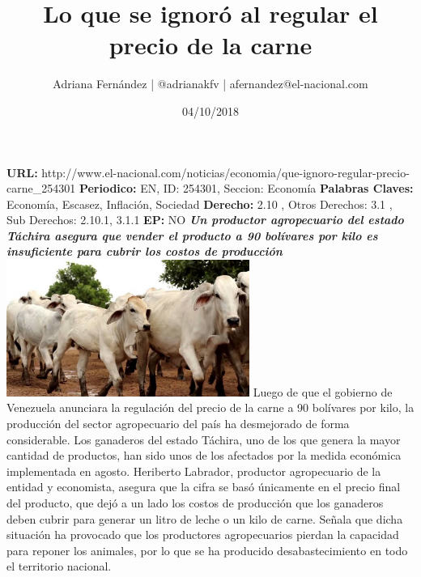 \documentclass{article}%
\title{\textbf{Lo que se ignoró al regular el precio de la carne}}%
\author{Adriana Fernández | @adrianakfv | afernandez@el{-}nacional.com}%
\date{04/10/2018}%
\begin{document}
%
\normalsize%
\maketitle%
\textbf{URL: }%
http://www.el{-}nacional.com/noticias/economia/que{-}ignoro{-}regular{-}precio{-}carne\_254301\newline%
%
\textbf{Periodico: }%
EN, %
ID: %
254301, %
Seccion: %
Economía\newline%
%
\textbf{Palabras Claves: }%
Economía, Escasez, Inflación, Sociedad\newline%
%
\textbf{Derecho: }%
2.10%
, Otros Derechos: %
3.1%
, Sub Derechos: %
2.10.1, 3.1.1%
\newline%
%
\textbf{EP: }%
NO\newline%
\newline%
%
\textbf{\textit{Un productor agropecuario del estado Táchira asegura que vender el producto a 90 bolívares por kilo es insuficiente para cubrir los costos de producción}}%
\newline%
\newline%
%
\includegraphics[width=300px]{1.jpg}%
\newline%
%
Luego de que el gobierno de Venezuela anunciara la regulación del precio de la carne a 90 bolívares por kilo, la producción del sector agropecuario del país ha desmejorado de forma considerable. Los ganaderos del estado Táchira, uno de los que genera la mayor cantidad de productos, han sido unos de los afectados por la medida económica implementada en agosto.%
\newline%
%
Heriberto Labrador, productor agropecuario de la entidad y economista, asegura que la cifra se basó únicamente en el precio final del producto, que dejó a un lado los costos de producción que los ganaderos deben cubrir para generar un litro de leche o un kilo de carne.%
\newline%
%
Señala que dicha situación ha provocado que los productores agropecuarios pierdan la capacidad para reponer los animales, por lo que se ha producido desabastecimiento en todo el territorio nacional.%
\newline%
\end{document}
